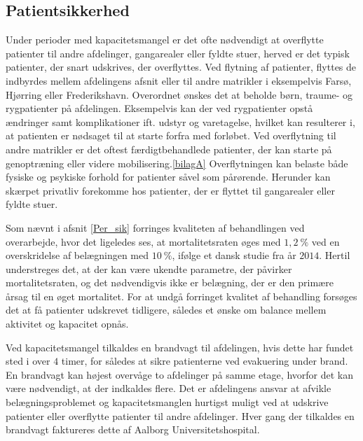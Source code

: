 \subsection{Patientsikkerhed}\label{patsik}
Under perioder med kapacitetsmangel er det ofte nødvendigt at overflytte patienter til andre afdelinger, gangarealer eller fyldte stuer, herved er det typisk patienter, der snart udskrives, der overflyttes. Ved flytning af patienter, flyttes de indbyrdes mellem afdelingens afsnit eller til andre matrikler i eksempelvis Farsø, Hjørring eller Frederikshavn. Overordnet ønskes det at beholde børn, traume- og rygpatienter på afdelingen. Eksempelvis kan der ved rygpatienter opstå ændringer samt komplikationer ift. udstyr og varetagelse, hvilket kan resulterer i, at patienten er nødsaget til at starte forfra med forløbet. Ved overflytning til andre matrikler er det oftest færdigtbehandlede patienter, der kan starte på genoptræning eller videre mobilisering.\ref{bilagA} Overflytningen kan belaste både fysiske og psykiske forhold for patienter såvel som pårørende\cite{Heidmann2014}. Herunder kan skærpet privatliv forekomme hos patienter, der er flyttet til gangarealer eller fyldte stuer\cite{Madsen2014}. 

Som nævnt i afsnit \ref{Per_sik} forringes kvaliteten af behandlingen ved overarbejde, hvor det ligeledes ses, at mortalitetsraten øges med $1,2~\%$ ved en overskridelse af belægningen med $10~\%$, ifølge et dansk studie fra år $2014$\cite{Madsen2014}. Hertil understreges det, at der kan være ukendte parametre, der påvirker mortalitetsraten, og det nødvendigvis ikke er belægning, der er den primære årsag til en øget mortalitet. For at undgå forringet kvalitet af behandling forsøges det at få patienter udskrevet tidligere, således et ønske om balance mellem aktivitet og kapacitet opnås.


Ved kapacitetsmangel tilkaldes en brandvagt til afdelingen, hvis dette har fundet sted i over $4$ timer, for således at sikre patienterne ved evakuering under brand. En brandvagt kan højest overvåge to afdelinger på samme etage, hvorfor det kan være nødvendigt, at der indkaldes flere. Det er afdelingens ansvar at afvikle belægningsproblemet og kapacitetsmanglen hurtigst muligt ved at udskrive patienter eller overflytte patienter til andre afdelinger. Hver gang der tilkaldes en brandvagt faktureres dette af Aalborg Universitetshospital.\cite{Beredskab2016}


